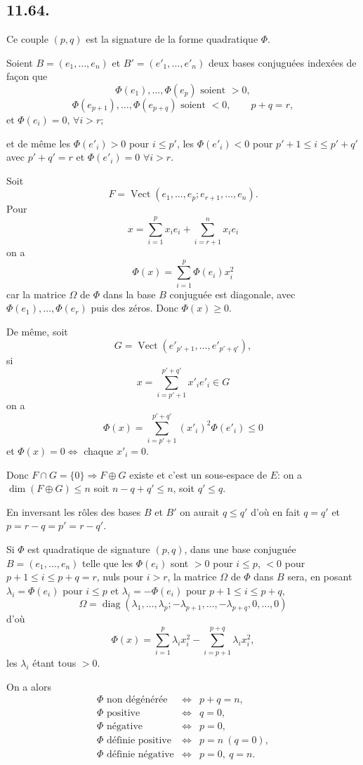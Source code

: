 \subsection*{11.64.}
Ce couple $(p,q)$ est la signature de la forme quadratique $\Phi$.

Soient $B=(e_1,\ldots,e_n)$ et $B'=(e'_1,\ldots,e'_n)$ deux bases conjuguées indexées de façon que
\[
\Phi(e_1),\ldots,\Phi(e_p)\text{ soient }>0,
\]
\[
\Phi(e_{p+1}),\ldots,\Phi(e_{p+q})\text{ soient }<0,
\qquad p+q=r,
\]
et $\Phi(e_i)=0$, $\forall i>r$;

et de même les $\Phi(e'_i)>0$ pour $i\le p'$, les $\Phi(e'_i)<0$ pour $p'+1\le i\le p'+q'$ avec $p'+q'=r$ et $\Phi(e'_i)=0$ $\forall i>r$.

Soit
\[
F=\operatorname{Vect}(e_1,\ldots,e_p;e_{r+1},\ldots,e_n).
\]
Pour
\[
x=\sum_{i=1}^p x_ie_i+\sum_{i=r+1}^n x_ie_i
\]
on a
\[
\Phi(x)=\sum_{i=1}^p\Phi(e_i)x_i^2
\]
car la matrice $\Omega$ de $\Phi$ dans la base $B$ conjuguée est diagonale, avec $\Phi(e_1),\ldots,\Phi(e_r)$ puis des zéros. Donc $\Phi(x)\ge0$.

De même, soit
\[
G=\operatorname{Vect}(e'_{p'+1},\ldots,e'_{p'+q'}),
\]
si
\[
x=\sum_{i=p'+1}^{p'+q'}x'_ie'_i\in G
\]
on a
\[
\Phi(x)=\sum_{i=p'+1}^{p'+q'}(x'_i)^2\Phi(e'_i)\le0
\]
et $\Phi(x)=0\Longleftrightarrow$ chaque $x'_i=0$.

Donc $F\cap G=\{0\}\Rightarrow F\oplus G$ existe et c'est un sous-espace de $E$: on a $\dim(F\oplus G)\le n$ soit $n-q+q'\le n$, soit $q'\le q$.

En inversant les rôles des bases $B$ et $B'$ on aurait $q\le q'$ d'où en fait $q=q'$ et $p=r-q=p'=r-q'$. \bookend

Si $\Phi$ est quadratique de signature $(p,q)$, dans une base conjuguée $B=(e_1,\ldots,e_n)$ telle que les $\Phi(e_i)$ sont $>0$ pour $i\le p$, $<0$ pour $p+1\le i\le p+q=r$, nuls pour $i>r$, la matrice $\Omega$ de $\Phi$ dans $B$ sera, en posant $\lambda_i=\Phi(e_i)$ pour $i\le p$ et $\lambda_i=-\Phi(e_i)$ pour $p+1\le i\le p+q$,
\[
\Omega=\operatorname{diag}(\lambda_1,\ldots,\lambda_p;-\lambda_{p+1},\ldots,-\lambda_{p+q},0,\ldots,0)
\]
d'où
\[
\Phi(x)=\sum_{i=1}^p\lambda_ix_i^2-\sum_{i=p+1}^{p+q}\lambda_ix_i^2,
\]
les $\lambda_i$ étant tous $>0$.

On a alors
\[
\begin{array}{rcl}
\Phi\text{ non dégénérée}&\Longleftrightarrow&p+q=n,\\
\Phi\text{ positive}&\Longleftrightarrow&q=0,\\
\Phi\text{ négative}&\Longleftrightarrow&p=0,\\
\Phi\text{ définie positive}&\Longleftrightarrow&p=n\ (q=0),\\
\Phi\text{ définie négative}&\Longleftrightarrow&p=0,\ q=n.
\end{array}
\]
